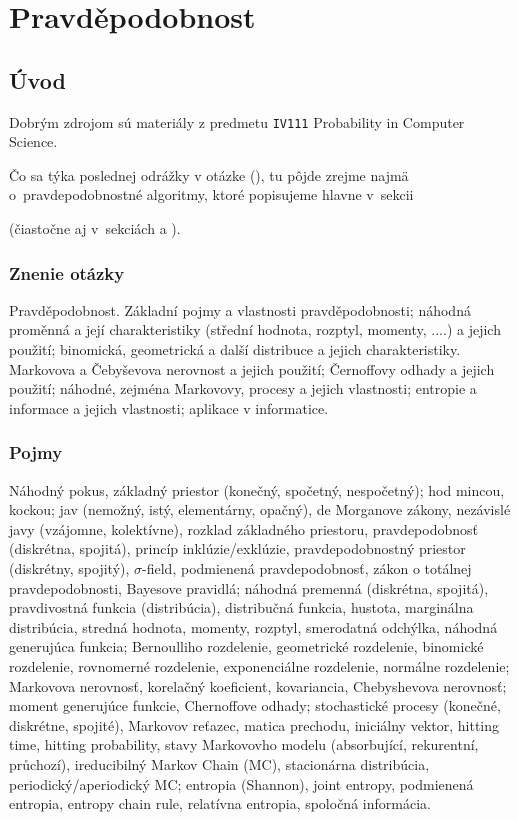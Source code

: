 \section{Pravděpodobnost}

\subsection{Úvod}
Dobrým zdrojom sú materiály z predmetu \verb|IV111| Probability in Computer Science.

Čo sa týka poslednej odrážky v otázke (), tu pôjde
zrejme najmä o~pravdepodobnostné algoritmy, ktoré popisujeme hlavne v~sekcii
{ (čiastočne aj v~sekciách  
a ).


\subsubsection*{Znenie otázky}
Pravděpodobnost. Základní pojmy a vlastnosti pravděpodobnosti; 
náhodná proměnná a její charakteristiky (střední hodnota, rozptyl, momenty, ....) 
a jejich použití; binomická, geometrická a další distribuce a jejich charakteristiky. 
Markovova a Čebyševova nerovnost a jejich použití; Černoffovy odhady a jejich použití; 
náhodné, zejména Markovovy, procesy a jejich vlastnosti; entropie a informace 
a jejich vlastnosti; aplikace v informatice.

\subsubsection*{Pojmy}
Náhodný pokus, základný priestor (konečný, spočetný, nespočetný); hod mincou, kockou;
jav (nemožný, istý, elementárny, opačný), de Morganove zákony, nezávislé 
javy (vzájomne, kolektívne), rozklad základného priestoru, 
pravdepodobnosť (diskrétna, spojitá), princíp inklúzie/exklúzie,
pravdepodobnostný priestor (diskrétny, spojitý), $\sigma$-field, 
podmienená pravdepodobnosť, zákon o totálnej pravdepodobnosti,
Bayesove pravidlá; náhodná premenná (diskrétna, spojitá), 
pravdivostná funkcia (distribúcia), distribučná funkcia, 
hustota, marginálna distribúcia, stredná hodnota, momenty,
rozptyl, smerodatná odchýlka, náhodná generujúca funkcia;
Bernoulliho rozdelenie, geometrické rozdelenie, binomické
rozdelenie, rovnomerné rozdelenie, exponenciálne rozdelenie,
normálne rozdelenie; Markovova nerovnosť, korelačný koeficient,
kovariancia, Chebyshevova nerovnosť; moment generujúce funkcie,
Chernoffove odhady; stochastické procesy (konečné, diskrétne,
spojité), Markovov reťazec, matica prechodu, iniciálny vektor,
hitting time, hitting probability, stavy Markovovho
modelu (absorbující, rekurentní, průchozí), ireducibilný Markov Chain (MC),
stacionárna distribúcia, periodický/aperiodický MC;
entropia (Shannon), joint entropy, podmienená entropia, 
entropy chain rule, relatívna entropia, spoločná informácia.

}
